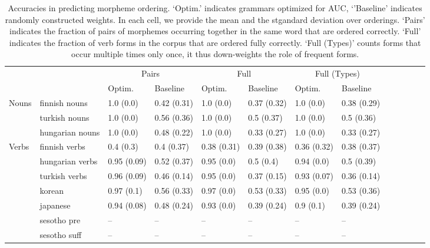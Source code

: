\documentclass[11pt,letterpaper]{article}
\begin{document}
\begin{table}[]
    \centering
    \begin{tabular}{l|l|ll|lllllllll}
    &     &    \multicolumn{2}{c|}{Pairs} & \multicolumn{2}{c|}{Full} & \multicolumn{2}{c}{Full (Types)} \\
     &   &     Optim. & Baseline & Optim. & Baseline & Optim. & Baseline \\ \hline
Nouns & finnish nouns & 1.0 (0.0) & 0.42 (0.31) & 1.0 (0.0) & 0.37 (0.32) & 1.0 (0.0) & 0.38 (0.29) \\
 & turkish nouns & 1.0 (0.0) & 0.56 (0.36) & 1.0 (0.0) & 0.5 (0.37) & 1.0 (0.0) & 0.5 (0.36) \\
 & hungarian nouns & 1.0 (0.0) & 0.48 (0.22) & 1.0 (0.0) & 0.33 (0.27) & 1.0 (0.0) & 0.33 (0.27) \\ \hline
Verbs & finnish verbs & 0.4 (0.3) & 0.4 (0.37) & 0.38 (0.31) & 0.39 (0.38) & 0.36 (0.32) & 0.38 (0.37) \\
 & hungarian verbs & 0.95 (0.09) & 0.52 (0.37) & 0.95 (0.0) & 0.5 (0.4) & 0.94 (0.0) & 0.5 (0.39) \\
 & turkish verbs & 0.96 (0.09) & 0.46 (0.14) & 0.95 (0.0) & 0.37 (0.15) & 0.93 (0.07) & 0.36 (0.14) \\
 & korean & 0.97 (0.1) & 0.56 (0.33) & 0.97 (0.0) & 0.53 (0.33) & 0.95 (0.0) & 0.53 (0.36) \\
 & japanese & 0.94 (0.08) & 0.48 (0.24) & 0.93 (0.0) & 0.39 (0.24) & 0.9 (0.1) & 0.39 (0.24) \\
 & sesotho pre & -- & -- & -- & -- & -- & -- \\
 & sesotho suff & -- & -- & -- & -- & -- & -- \\

    \end{tabular}
    \caption{Accuracies in predicting morpheme ordering. `Optim.' indicates grammars optimized for AUC, `'Baseline' indicates randomly constructed weights.
    In each cell, we provide the mean and the stgandard deviation over orderings. `Pairs' indicates the fraction of pairs of morphemes occurring together in the same word that are ordered correctly. `Full' indicates the fraction of verb forms in the corpus that are ordered fully correctly. `Full (Types)' counts forms that occur multiple times only once, it thus down-weights the role of frequent forms.}
    \label{tab:my_label}
\end{table}
\end{document}
